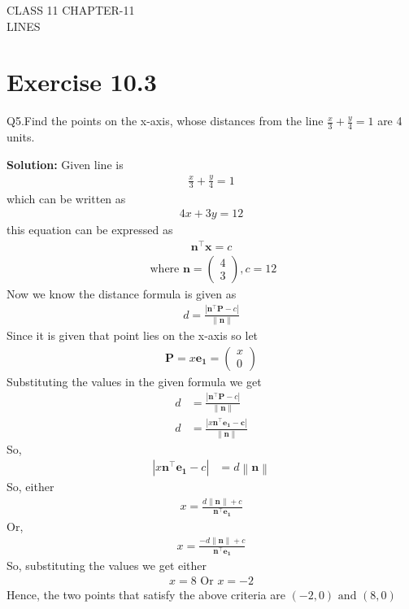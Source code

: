\documentclass[12pt]{article}
\providecommand{\brak}[1]{\ensuremath{\left(#1\right)}}
\providecommand{\norm}[1]{\left\lVert#1\right\rVert}
\newcommand{\solution}{\noindent \textbf{Solution: }}
\newcommand{\myvec}[1]{\ensuremath{\begin{pmatrix}#1\end{pmatrix}}}
\providecommand{\abs}[1]{\left\vert#1\right\vert}
\let\vec\mathbf
\begin{document}
\begin{center}
\textbf\large{CLASS 11 CHAPTER-11 \\ LINES}

\end{center}
\section*{Exercise 10.3}

Q5.Find the points on the x-axis, whose distances from the line $\frac{x}{3}+\frac{y}{4}=1$ are 4 units.

\solution
Given line is 
\begin{align}
	\frac{x}{3}+\frac{y}{4}=1
\end{align}
which can be written as
\begin{align}
	4x+3y=12
\end{align}
this equation can be expressed as 
\begin{align}
	\vec{n}^{\top}\vec{x}=c
\end{align}
\begin{align}
	\text{ where }
		\vec{n} = \myvec{4\\3} , c = 12
\end{align}
Now we know the distance formula is given as
\begin{align}
	d = \frac{\abs{\vec{n}^\top\vec{P}-c}}{\norm{\vec{n}}}
\end{align}
Since it is given that point lies on the x-axis so let
\begin{align}
	\vec{P} = x\vec{e_{1}} = \myvec{x\\0}
\end{align}
Substituting the values in the given formula we get
\begin{align}
	d &= \frac{\abs{\vec{n}^\top\vec{P}-c}}{\norm{\vec{n}}}\\
	d &= \frac{\abs{x\vec{n}^\top\vec{e_{1}-c}}}{\norm{\vec{n}}}
\end{align}
So,
\begin{align}
	\abs{x\vec{n}^\top\vec{e_{1}}-c} &= d\norm{\vec{n}}
\end{align}
So, either
\begin{align}
	x = \frac{d\norm{\vec{n}}+c}{\vec{n}^\top\vec{e_{1}}}
\end{align}
Or,
\begin{align}
	x = \frac{-d\norm{\vec{n}}+c}{\vec{n}^\top\vec{e_{1}}}
\end{align}
So, substituting the values we get either
\begin{align}
	x = 8
	\text{ Or }
	x = -2
\end{align}
Hence, the two points that satisfy the above criteria are $\brak{-2,0} \text{ and } \brak{8,0}$	
\end{document}
